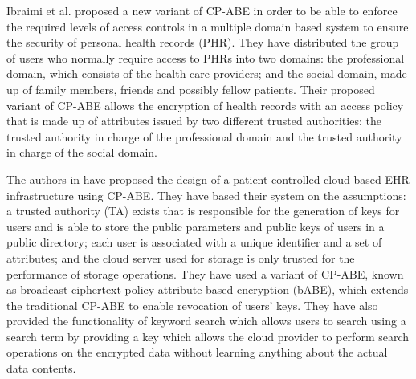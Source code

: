 Ibraimi et al. proposed a new variant of CP-ABE \cite{Ibraimi2010} in order to be able to enforce the required levels of access controls in a multiple domain based system to ensure the security of personal health records (PHR). They have distributed the group of users who normally require access to PHRs into two domains: the professional domain, which consists of the health care providers; and the social domain, made up of family members, friends and possibly fellow patients. Their proposed variant of CP-ABE allows the encryption of health records with an access policy that is made up of attributes issued by two different trusted authorities: the trusted authority in charge of the professional domain and the trusted authority in charge of the social domain.

The authors in \cite{Narayan2010} have proposed the design of a patient controlled cloud based EHR infrastructure using CP-ABE. They have based their system on the assumptions: a trusted authority (TA) exists that is responsible for the generation of keys for users and is able to store the public parameters and public keys of users in a public directory; each user is associated with a unique identifier and a set of attributes; and the cloud server used for storage is only trusted for the performance of storage operations. They have used a variant of CP-ABE, known as broadcast ciphertext-policy attribute-based encryption (bABE), which extends the traditional CP-ABE to enable revocation of users' keys. They have also provided the functionality of keyword search which allows users to search using a search term by providing a key which allows the cloud provider to perform search operations on the encrypted data without learning anything about the actual data contents.

